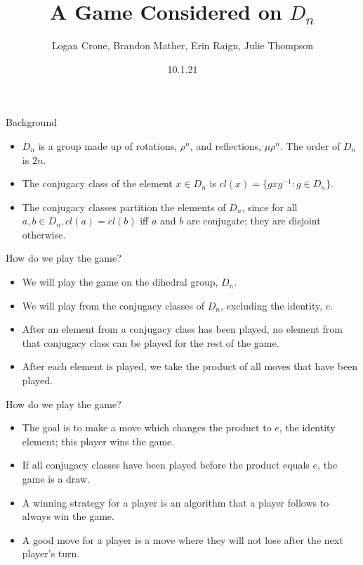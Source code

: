 \documentclass{beamer}
\title{A Game Considered on $D_n$}
\author{Logan Crone, Brandon Mather, Erin Raign, Julie Thompson}
\date{10.1.21}
\begin{document}
\begin{frame}

\titlepage

\end{frame}
    
\begin{frame}{Background}
   \begin{itemize}
       \item $D_n$ is a group made up of rotations, $\rho^n$, and reflections, $\mu \rho^n$. The order of $D_n$ is $2n$. \bigskip
       \item The conjugacy class of the element $x\in D_n$ is $cl(x) = \{gxg^{-1} : g\in D_n\}$.\\ \bigskip
       
       \item The conjugacy classes partition the elements of $D_n$, since for all $a,b\in D_n, cl(a)=cl(b)$ iff $a$ and $b$ are conjugate; they are disjoint otherwise.
      
   \end{itemize} 
   
\end{frame}

\begin{frame}{How do we play the game?}
\begin{itemize}
    \item We will play the game on the dihedral group, $D_n$.
    \medskip
     \item We will play from the conjugacy classes of $D_n$, excluding the identity, $e$.
     \medskip
    \item After an element from a conjugacy class has been played, no element from that conjugacy class can be played for the rest of the game.
    \medskip
    \item After each element is played, we take the product of all moves that have been played.
\end{itemize}
\end{frame}

\begin{frame}{How do we play the game?}
    \begin{itemize}
        \item The goal is to make a move which changes the product to $e$, the identity element; this player wins the game.
        \medskip
        \item If all conjugacy classes have been played before the product equals $e$, the game is a draw.
        \medskip
        \item A winning strategy for a player is an algorithm that a player follows to always win the game.
        \medskip
        \item A good move for a player is a move where they will not lose after the next player's turn.
    \end{itemize}
\end{frame}
\end{document}
